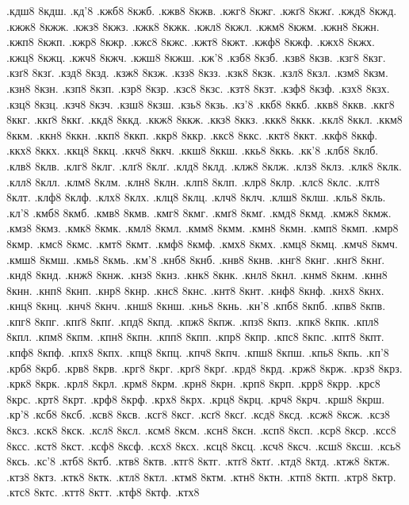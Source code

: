 {.кдш8
8кдш.
.кд'8
.кжб8
8кжб.
.кжв8
8кжв.
.кжг8
8кжг.
.кжґ8
8кжґ.
.кжд8
8кжд.
.кжж8
8кжж.
.кжз8
8кжз.
.кжк8
8кжк.
.кжл8
8кжл.
.кжм8
8кжм.
.кжн8
8кжн.
.кжп8
8кжп.
.кжр8
8кжр.
.кжс8
8кжс.
.кжт8
8кжт.
.кжф8
8кжф.
.кжх8
8кжх.
.кжц8
8кжц.
.кжч8
8кжч.
.кжш8
8кжш.
.кж'8
.кзб8
8кзб.
.кзв8
8кзв.
.кзг8
8кзг.
.кзґ8
8кзґ.
.кзд8
8кзд.
.кзж8
8кзж.
.кзз8
8кзз.
.кзк8
8кзк.
.кзл8
8кзл.
.кзм8
8кзм.
.кзн8
8кзн.
.кзп8
8кзп.
.кзр8
8кзр.
.кзс8
8кзс.
.кзт8
8кзт.
.кзф8
8кзф.
.кзх8
8кзх.
.кзц8
8кзц.
.кзч8
8кзч.
.кзш8
8кзш.
.кзь8
8кзь.
.кз'8
.ккб8
8ккб.
.ккв8
8ккв.
.ккг8
8ккг.
.ккґ8
8ккґ.
.ккд8
8ккд.
.ккж8
8ккж.
.ккз8
8ккз.
.ккк8
8ккк.
.ккл8
8ккл.
.ккм8
8ккм.
.ккн8
8ккн.
.ккп8
8ккп.
.ккр8
8ккр.
.ккс8
8ккс.
.ккт8
8ккт.
.ккф8
8ккф.
.ккх8
8ккх.
.ккц8
8ккц.
.ккч8
8ккч.
.ккш8
8ккш.
.ккь8
8ккь.
.кк'8
.клб8
8клб.
.клв8
8клв.
.клг8
8клг.
.клґ8
8клґ.
.клд8
8клд.
.клж8
8клж.
.клз8
8клз.
.клк8
8клк.
.клл8
8клл.
.клм8
8клм.
.клн8
8клн.
.клп8
8клп.
.клр8
8клр.
.клс8
8клс.
.клт8
8клт.
.клф8
8клф.
.клх8
8клх.
.клц8
8клц.
.клч8
8клч.
.клш8
8клш.
.кль8
8кль.
.кл'8
.кмб8
8кмб.
.кмв8
8кмв.
.кмг8
8кмг.
.кмґ8
8кмґ.
.кмд8
8кмд.
.кмж8
8кмж.
.кмз8
8кмз.
.кмк8
8кмк.
.кмл8
8кмл.
.кмм8
8кмм.
.кмн8
8кмн.
.кмп8
8кмп.
.кмр8
8кмр.
.кмс8
8кмс.
.кмт8
8кмт.
.кмф8
8кмф.
.кмх8
8кмх.
.кмц8
8кмц.
.кмч8
8кмч.
.кмш8
8кмш.
.кмь8
8кмь.
.км'8
.кнб8
8кнб.
.кнв8
8кнв.
.кнг8
8кнг.
.кнґ8
8кнґ.
.кнд8
8кнд.
.кнж8
8кнж.
.кнз8
8кнз.
.кнк8
8кнк.
.кнл8
8кнл.
.кнм8
8кнм.
.кнн8
8кнн.
.кнп8
8кнп.
.кнр8
8кнр.
.кнс8
8кнс.
.кнт8
8кнт.
.кнф8
8кнф.
.кнх8
8кнх.
.кнц8
8кнц.
.кнч8
8кнч.
.кнш8
8кнш.
.кнь8
8кнь.
.кн'8
.кпб8
8кпб.
.кпв8
8кпв.
.кпг8
8кпг.
.кпґ8
8кпґ.
.кпд8
8кпд.
.кпж8
8кпж.
.кпз8
8кпз.
.кпк8
8кпк.
.кпл8
8кпл.
.кпм8
8кпм.
.кпн8
8кпн.
.кпп8
8кпп.
.кпр8
8кпр.
.кпс8
8кпс.
.кпт8
8кпт.
.кпф8
8кпф.
.кпх8
8кпх.
.кпц8
8кпц.
.кпч8
8кпч.
.кпш8
8кпш.
.кпь8
8кпь.
.кп'8
.крб8
8крб.
.крв8
8крв.
.крг8
8крг.
.крґ8
8крґ.
.крд8
8крд.
.крж8
8крж.
.крз8
8крз.
.крк8
8крк.
.крл8
8крл.
.крм8
8крм.
.крн8
8крн.
.крп8
8крп.
.крр8
8крр.
.крс8
8крс.
.крт8
8крт.
.крф8
8крф.
.крх8
8крх.
.крц8
8крц.
.крч8
8крч.
.крш8
8крш.
.кр'8
.ксб8
8ксб.
.ксв8
8ксв.
.ксг8
8ксг.
.ксґ8
8ксґ.
.ксд8
8ксд.
.ксж8
8ксж.
.ксз8
8ксз.
.кск8
8кск.
.ксл8
8ксл.
.ксм8
8ксм.
.ксн8
8ксн.
.ксп8
8ксп.
.кср8
8кср.
.ксс8
8ксс.
.кст8
8кст.
.ксф8
8ксф.
.ксх8
8ксх.
.ксц8
8ксц.
.ксч8
8ксч.
.ксш8
8ксш.
.ксь8
8ксь.
.кс'8
.ктб8
8ктб.
.ктв8
8ктв.
.ктг8
8ктг.
.ктґ8
8ктґ.
.ктд8
8ктд.
.ктж8
8ктж.
.ктз8
8ктз.
.ктк8
8ктк.
.ктл8
8ктл.
.ктм8
8ктм.
.ктн8
8ктн.
.ктп8
8ктп.
.ктр8
8ктр.
.ктс8
8ктс.
.ктт8
8ктт.
.ктф8
8ктф.
.ктх8
}
